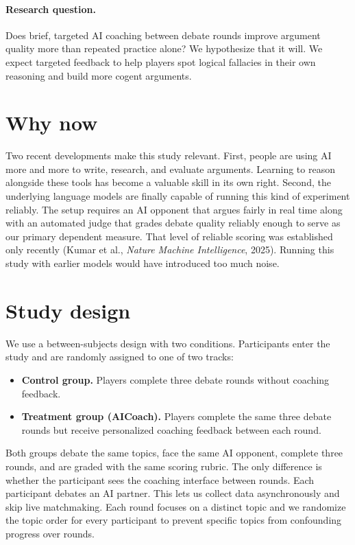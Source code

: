\documentclass[11pt]{article}
\begin{document}
\paragraph{Research question.} Does brief, targeted AI coaching between debate rounds improve argument quality more than repeated practice alone? We hypothesize that it will. We expect targeted feedback to help players spot logical fallacies in their own reasoning and build more cogent arguments.

\section{Why now}
\label{sec:whynow}

Two recent developments make this study relevant. First, people are using AI more and more to write, research, and evaluate arguments. Learning to reason alongside these tools has become a valuable skill in its own right. Second, the underlying language models are finally capable of running this kind of experiment reliably. The setup requires an AI opponent that argues fairly in real time along with an automated judge that grades debate quality reliably enough to serve as our primary dependent measure. That level of reliable scoring was established only recently (Kumar et al., \emph{Nature Machine Intelligence}, 2025). Running this study with earlier models would have introduced too much noise.

\section{Study design}
\label{sec:design}

We use a between-subjects design with two conditions. Participants enter the study and are randomly assigned to one of two tracks:

\begin{itemize}[nosep]
  \item \textbf{Control group.} Players complete three debate rounds without coaching feedback.
  \item \textbf{Treatment group (AICoach).} Players complete the same three debate rounds but receive personalized coaching feedback between each round.
\end{itemize}

Both groups debate the same topics, face the same AI opponent, complete three rounds, and are graded with the same scoring rubric. The only difference is whether the participant sees the coaching interface between rounds. Each participant debates an AI partner. This lets us collect data asynchronously and skip live matchmaking. Each round focuses on a distinct topic and we randomize the topic order for every participant to prevent specific topics from confounding progress over rounds.
\end{document}
